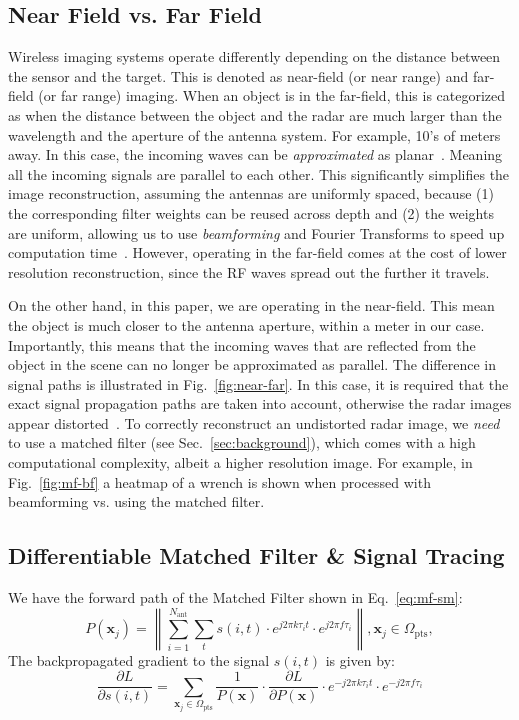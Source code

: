 \subsection{Near Field vs. Far Field}\label{sec:app-radar-nf-ff}
Wireless imaging systems operate differently depending on the distance between the sensor and the target. This is denoted as near-field (or near range) and far-field (or far range) imaging. When an object is in the far-field, this is categorized as when the distance between the object and the radar are much larger than the wavelength and the aperture of the antenna system. For example, 10's of meters away. In this case, the incoming waves can be \textit{approximated} as planar~\cite{richards2010principles}. Meaning all the incoming signals are parallel to each other. This significantly simplifies the image reconstruction, assuming the antennas are uniformly spaced, because (1) the corresponding filter weights can be reused across depth and (2) the weights are uniform, allowing us to use \textit{beamforming} and Fourier Transforms to speed up computation time~\cite{andersson2012fast}. However, operating in the far-field comes at the cost of lower resolution reconstruction, since the RF waves spread out the further it travels.


On the other hand, in this paper, we are operating in the near-field. This mean the object is much closer to the antenna aperture, within a meter in our case. Importantly, this means that the incoming waves that are reflected from the object in the scene can no longer be approximated as parallel.  The difference in signal paths is illustrated in Fig.~\ref{fig:near-far}. In this case, it is required that the exact signal propagation paths are taken into account, otherwise the radar images appear distorted~\cite{yanik2019near, sheen2001three}. To correctly reconstruct an undistorted radar image, we \textit{need} to use a matched filter (see Sec.~\ref{sec:background}), which comes with a high computational complexity, albeit a higher resolution image. For example, in Fig.~\ref{fig:mf-bf} a heatmap of a wrench is shown when processed with beamforming vs. using the matched filter.


\subsection{Differentiable Matched Filter \& Signal Tracing}
\label{sec:app-mf}
We have the forward path of the Matched Filter shown in Eq.~\ref{eq:mf-sm}:
\begin{equation*} 
P(\mathbf{x}_j) = \left\lVert \sum_{i = 1}^{N_{\text{ant}}} \sum_{t} s(i, t) \cdot e^{j 2\pi k \tau_i t} \cdot e^{j 2\pi f \tau_i} \right\rVert, \mathbf{x}_j \in \Omega_\text{pts},
\end{equation*}
The backpropagated gradient to the signal $s(i, t)$ is given by:
\begin{equation}
    \frac{\partial L}{\partial s(i,t)} = \sum_{\mathbf{x}_j \in \Omega_\text{pts}} \frac{1}{P(\mathbf{x})} \cdot \frac{\partial L}{\partial P(\mathbf{x})} \cdot e^{-j 2\pi k \tau_i t} \cdot e^{-j 2\pi f \tau_i}
\end{equation}


